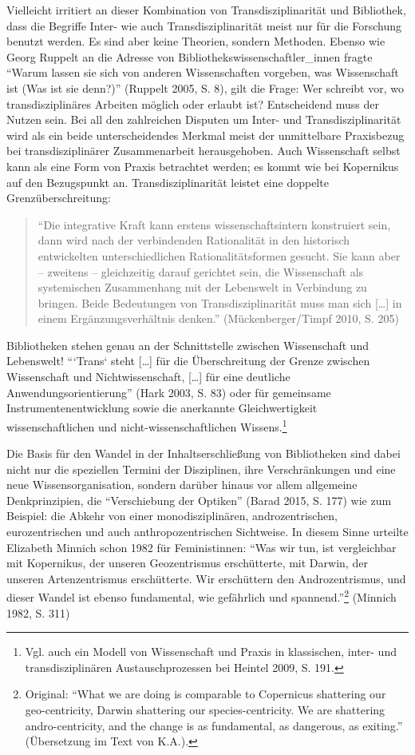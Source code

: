 Vielleicht irritiert an dieser Kombination von Transdisziplinarität und
Bibliothek, dass die Begriffe Inter- wie auch Transdisziplinarität meist
nur für die Forschung benutzt werden. Es sind aber keine Theorien,
sondern Methoden. Ebenso wie Georg Ruppelt an die Adresse von
Bibliothekswissenschaftler\_innen fragte \enquote{Warum lassen sie sich
von anderen Wissenschaften vorgeben, was Wissenschaft ist (Was ist sie
denn?)} (Ruppelt 2005, S. 8), gilt die Frage: Wer schreibt vor, wo
transdisziplinäres Arbeiten möglich oder erlaubt ist? Entscheidend muss
der Nutzen sein. Bei all den zahlreichen Disputen um Inter- und
Transdisziplinarität wird als ein beide unterscheidendes Merkmal meist
der unmittelbare Praxisbezug bei transdisziplinärer Zusammenarbeit
herausgehoben. Auch Wissenschaft selbst kann als eine Form von Praxis
betrachtet werden; es kommt wie bei Kopernikus auf den Bezugspunkt an.
Transdisziplinarität leistet eine doppelte Grenzüberschreitung:

\begin{quote}
\enquote{Die integrative Kraft kann erstens wissenschaftsintern
konstruiert sein, dann wird nach der verbindenden Rationalität in den
historisch entwickelten unterschiedlichen Rationalitätsformen gesucht.
Sie kann aber -- zweitens -- gleichzeitig darauf gerichtet sein, die
Wissenschaft als systemischen Zusammenhang mit der Lebenswelt in
Verbindung zu bringen. Beide Bedeutungen von Transdisziplinarität muss
man sich {[}\ldots{}{]} in einem Ergänzungsverhältnis denken.}
(Mückenberger/Timpf 2010, S. 205)
\end{quote}

Bibliotheken stehen genau an der Schnittstelle zwischen Wissenschaft und
Lebenswelt! \enquote{`Trans` steht {[}\ldots{}{]} für die Überschreitung
der Grenze zwischen Wissenschaft und Nichtwissenschaft, {[}\ldots{}{]}
für eine deutliche Anwendungsorientierung} (Hark 2003, S. 83) oder für
gemeinsame Instrumentenentwicklung sowie die anerkannte Gleichwertigkeit
wissenschaftlichen und nicht-wissenschaftlichen Wissens.\footnote{Vgl.
  auch ein Modell von Wissenschaft und Praxis in klassischen, inter- und
  transdisziplinären Austauschprozessen bei Heintel 2009, S. 191.}

Die Basis für den Wandel in der Inhaltserschließung von Bibliotheken
sind dabei nicht nur die speziellen Termini der Disziplinen, ihre
Verschränkungen und eine neue Wissensorganisation, sondern darüber
hinaus vor allem allgemeine Denkprinzipien, die \enquote{Verschiebung
der Optiken} (Barad 2015, S. 177) wie zum Beispiel: die Abkehr von einer
monodisziplinären, androzentrischen, eurozentrischen und auch
anthropozentrischen Sichtweise. In diesem Sinne urteilte Elizabeth
Minnich schon 1982 für Feministinnen: \enquote{Was wir tun, ist
vergleichbar mit Kopernikus, der unseren Geozentrismus erschütterte, mit
Darwin, der unseren Artenzentrismus erschütterte. Wir erschüttern den
Androzentrismus, und dieser Wandel ist ebenso fundamental, wie
gefährlich und spannend.}\footnote{Original: \enquote{What we are doing
  is comparable to Copernicus shattering our geo-centricity, Darwin
  shattering our species-centricity. We are shattering andro-centricity,
  and the change is as fundamental, as dangerous, as exiting.}
  (Übersetzung im Text von K.A.).} (Minnich 1982, S. 311)

